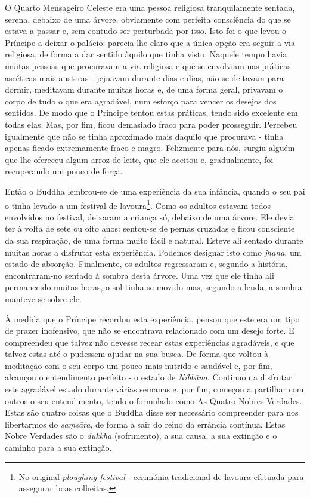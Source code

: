 O Quarto Mensageiro Celeste era uma pessoa religiosa tranquilamente
sentada, serena, debaixo de uma árvore, obviamente com perfeita
consciência do que se estava a passar e, sem contudo ser perturbada por
isso. Isto foi o que levou o Príncipe a deixar o palácio: parecia-lhe
claro que a única opção era seguir a via religiosa, de forma a dar
sentido àquilo que tinha visto. Naquele tempo havia muitas pessoas que
procuravam a via religiosa e que se envolviam nas práticas ascéticas
mais austeras - jejuavam durante dias e dias, não se deitavam para
dormir, meditavam durante muitas horas e, de uma forma geral, privavam o
corpo de tudo o que era agradável, num esforço para vencer os desejos
dos sentidos. De modo que o Príncipe tentou estas práticas, tendo sido
excelente em todas elas. Mas, por fim, ficou demasiado fraco para poder
prosseguir. Percebeu igualmente que não se tinha aproximado mais daquilo
que procurava - tinha apenas ficado extremamente fraco e magro.
Felizmente para nós, surgiu alguém que lhe ofereceu algum arroz de
leite, que ele aceitou e, gradualmente, foi recuperando um pouco de
força.

Então o Buddha lembrou-se de uma experiência da sua infância, quando o
seu pai o tinha levado a um festival de lavoura\footnote{No original
  \emph{ploughing festival} - cerimónia tradicional de lavoura efetuada
  para assegurar boas colheitas.}. Como os adultos estavam todos
envolvidos no festival, deixaram a criança só, debaixo de uma árvore.
Ele devia ter à volta de sete ou oito anos: sentou-se de pernas cruzadas
e ficou consciente da sua respiração, de uma forma muito fácil e
natural. Esteve ali sentado durante muitas horas a disfrutar esta
experiência. Podemos designar isto como \emph{jhana}, um estado de
absorção. Finalmente, os adultos regressaram e, segundo a história,
encontraram-no sentado à sombra desta árvore. Uma vez que ele tinha ali
permanecido muitas horas, o sol tinha-se movido mas, segundo a lenda, a
sombra manteve-se sobre ele.

À medida que o Príncipe recordou esta experiência, pensou que este era
um tipo de prazer inofensivo, que não se encontrava relacionado com um
desejo forte. E compreendeu que talvez não devesse recear estas
experiências agradáveis, e que talvez estas até o pudessem ajudar na sua
busca. De forma que voltou à meditação com o seu corpo um pouco mais
nutrido e saudável e, por fim, alcançou o entendimento perfeito - o
estado de \emph{Nibbāna}. Continuou a disfrutar este agradável estado
durante várias semanas e, por fim, começou a partilhar com outros o seu
entendimento, tendo-o formulado como As Quatro Nobres Verdades. Estas
são quatro coisas que o Buddha disse ser necessário compreender para nos
libertarmos do \emph{saṃsāra}, de forma a sair do reino da errância
contínua. Estas Nobre Verdades são o \emph{dukkha} (sofrimento), a sua
causa, a sua extinção e o caminho para a sua extinção.

